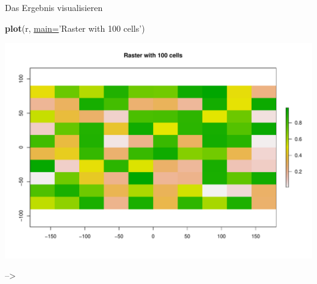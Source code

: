 \documentclass[ignorenonframetext,]{beamer}
\newenvironment{Shaded}{\begin{snugshade}}{\end{snugshade}}
\newcommand{\DataTypeTok}[1]{\textcolor[rgb]{0.74,0.68,0.62}{\underline{#1}}}
\newcommand{\KeywordTok}[1]{\textcolor[rgb]{0.26,0.66,0.93}{\textbf{#1}}}
\newcommand{\NormalTok}[1]{\textcolor[rgb]{0.74,0.68,0.62}{#1}}
\newcommand{\StringTok}[1]{\textcolor[rgb]{0.02,0.61,0.04}{#1}}
\begin{document}
\begin{frame}[fragile]{Das Ergebnis visualisieren}
\protect\hypertarget{das-ergebnis-visualisieren}{}

\begin{Shaded}
\begin{Highlighting}[]
\KeywordTok{plot}\NormalTok{(r, }\DataTypeTok{main=}\StringTok{'Raster with 100 cells'}\NormalTok{)}
\end{Highlighting}
\end{Shaded}

\includegraphics{A8_Rasterdaten_files/figure-beamer/unnamed-chunk-5-1.pdf}

--\textgreater{}

\end{frame}
\end{document}
